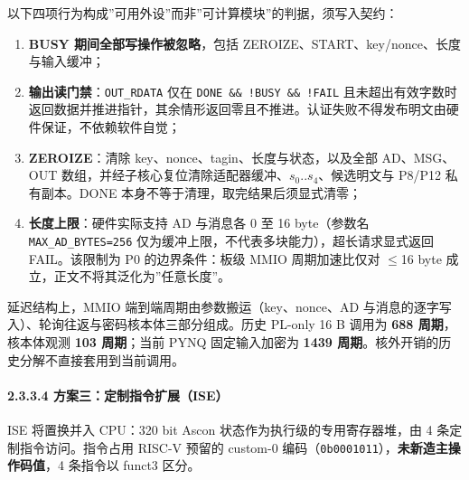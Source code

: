 以下四项行为构成''可用外设''而非''可计算模块''的判据，须写入契约：

\begin{enumerate}
\def\labelenumi{\arabic{enumi}.}
\tightlist
\item
  \textbf{BUSY 期间全部写操作被忽略}，包括 ZEROIZE、START、key/nonce、长度与输入缓冲；
\item
  \textbf{输出读门禁}：\texttt{OUT\_\allowbreak{}RDATA} 仅在 \texttt{DONE\ \&\&\ !BUSY\ \&\&\ !FAIL} 且未超出有效字数时返回数据并推进指针，其余情形返回零且不推进。认证失败不得发布明文由硬件保证，不依赖软件自觉；
\item
  \textbf{ZEROIZE}：清除 key、nonce、tagin、长度与状态，以及全部 AD、MSG、OUT 数组，并经子核心复位清除适配器缓冲、\(s_0..s_4\)、候选明文与 P8/P12 私有副本。DONE 本身不等于清理，取完结果后须显式清零；
\item
  \textbf{长度上限}：硬件实际支持 AD 与消息各 0 至 16 byte（参数名 \texttt{MAX\_\allowbreak{}AD\_\allowbreak{}BYTES=256} 仅为缓冲上限，不代表多块能力），超长请求显式返回 FAIL。该限制为 P0 的边界条件：板级 MMIO 周期加速比仅对 $\leq$16 byte 成立，正文不将其泛化为''任意长度''。
\end{enumerate}

延迟结构上，MMIO 端到端周期由参数搬运（key、nonce、AD 与消息的逐字写入）、轮询往返与密码核本体三部分组成。历史 PL-only 16 B 调用为 \textbf{688 周期}，核本体观测 \textbf{103 周期}；当前 PYNQ 固定输入加密为 \textbf{1439 周期}。核外开销的历史分解不直接套用到当前调用。

\Needspace{85pt}

\paragraph{2.3.3.4 方案三：定制指令扩展（ISE）}\label{ux65b9ux6848ux4e09ux5b9aux5236ux6307ux4ee4ux6269ux5c55ise}

ISE 将置换并入 CPU：320 bit Ascon 状态作为执行级的专用寄存器堆，由 4 条定制指令访问。指令占用 RISC-V 预留的 custom-0 编码（\texttt{0b0001011}），\textbf{未新造主操作码值}，4 条指令以 funct3 区分。


